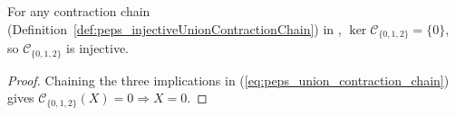 \begin{lemma}%
    \label{lem:peps_injectiveRegion_union_contractionChain}
    \leanok
    For any contraction chain
    (Definition~\ref{def:peps_injectiveUnionContractionChain}) in
    \cite[Section~4]{Molnar2018NormalPEPS},
    $\ker \mathcal C_{\{0,1,2\}}=\{0\}$, so $\mathcal C_{\{0,1,2\}}$ is injective.
\end{lemma}
\begin{proof}\leanok
    Chaining the three implications in (\ref{eq:peps_union_contraction_chain})
    gives $\mathcal C_{\{0,1,2\}}(X)=0\Longrightarrow X=0$.
\end{proof}

